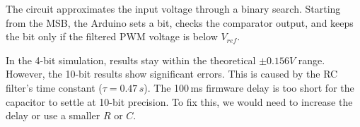 \documentclass[12pt]{article}
\begin{document}
The circuit approximates the input voltage through a binary search. Starting from the MSB, the Arduino sets a bit, checks the comparator output, and keeps the bit only if the filtered PWM voltage is below $V_{ref}$. 

In the 4-bit simulation, results stay within the theoretical $\pm 0.156V$ range. However, the 10-bit results show significant errors. This is caused by the RC filter's time constant ($\tau = 0.47\,s$). The 100\,ms firmware delay is too short for the capacitor to settle at 10-bit precision. To fix this, we would need to increase the delay or use a smaller $R$ or $C$.
\end{document}
